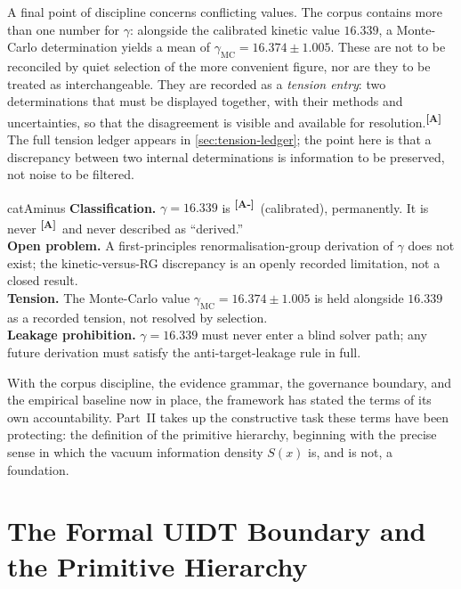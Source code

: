 \documentclass[12pt,a4paper,twoside]{article}
\theoremstyle{plain}
\theoremstyle{definition}
\theoremstyle{remark}
\newcommand{\catmark}[1]{\textsuperscript{\textsf{\textbf{[#1]}}}}
\newcommand{\Sx}{S(x)}
\newcommand{\GammaGeom}{16.339} %
\newcommand{\GammaMC}{16.374 \pm 1.005} %
\begin{document}
A final point of discipline concerns conflicting values. The corpus contains more than one number for $\gamma$: alongside the calibrated kinetic value $16.339$, a Monte-Carlo determination yields a mean of $\gamma_{\mathrm{MC}} = \GammaMC$. These are not to be reconciled by quiet selection of the more convenient figure, nor are they to be treated as interchangeable. They are recorded as a \emph{tension entry}: two determinations that must be displayed together, with their methods and uncertainties, so that the disagreement is visible and available for resolution.\catmark{A} The full tension ledger appears in \cref{sec:tension-ledger}; the point here is that a discrepancy between two internal determinations is information to be preserved, not noise to be filtered.

\begin{evidencebox}{catAminus}
\textbf{Classification.} $\gamma = \GammaGeom$ is \catmark{A-}\ (calibrated), permanently. It is never \catmark{A}\ and never described as
``derived.''\\[0.3em]
\textbf{Open problem.} A first-principles renormalisation-group derivation of $\gamma$ does not exist; the kinetic-versus-RG discrepancy is an openly recorded
limitation, not a closed result.\\[0.3em]
\textbf{Tension.} The Monte-Carlo value $\gamma_{\mathrm{MC}} = \GammaMC$ is held alongside $16.339$ as a recorded tension, not resolved by
selection.\\[0.3em]
\textbf{Leakage prohibition.} $\gamma = 16.339$ must never enter a blind solver path; any future derivation must satisfy the anti-target-leakage rule in full.
\end{evidencebox}

\noindent With the corpus discipline, the evidence grammar, the governance boundary, and the empirical baseline now in place, the framework has stated the terms of its own accountability. Part~II takes up the constructive task these terms have been protecting: the definition of the primitive hierarchy, beginning with the precise sense in which the vacuum information density $\Sx$ is, and is not, a foundation.

\part{The Formal UIDT Boundary and the Primitive Hierarchy}
\label{part:primitive-hierarchy}
\end{document}
